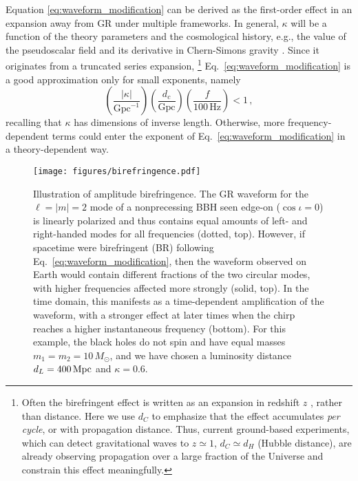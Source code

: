 \documentclass[aps,prd,twocolumn,superscriptaddress,preprintnumbers,nofootinbib]{revtex4-2}
\begin{document}
Equation \eqref{eq:waveform_modification} can be derived as the first-order effect in an expansion away from \ac{GR} under multiple frameworks.
In general, $\kappa$ will be a function of the theory parameters and the cosmological history, e.g., the value of the pseudoscalar field and its derivative in Chern-Simons gravity \cite{Alexander:2009tp}.
Since it originates from a truncated series expansion,%
\footnote{Often the birefringent effect is written as an expansion in redshift $z$ \cite[e.g.][]{Zhao:2019xmm}, rather than distance. Here we use $d_C$ to emphasize that the effect accumulates \emph{per cycle}, or with propagation distance.  Thus, current ground-based experiments, which can detect gravitational waves to $z \simeq 1$, $d_C \simeq d_H$ (Hubble distance), are already observing propagation over a large fraction of the Universe and constrain this effect meaningfully.} %
Eq.~\eqref{eq:waveform_modification} is a good approximation only for small exponents, namely
\begin{equation}
    \left(\frac{\left|\kappa\right|}{\mathrm{Gpc}^{-1}}\right) \left(\frac{d_c}{\mathrm{Gpc}}\right) \left(\frac{f}{100\, \mathrm{Hz}}\right) < 1\,,
    \label{eq:small_exponent}
\end{equation}
recalling that $\kappa$ has dimensions of inverse length.
Otherwise, more frequency-dependent terms could enter the exponent of Eq.~\eqref{eq:waveform_modification} in a theory-dependent way.
\begin{figure}
    \texttt{[image: figures/birefringence.pdf]}
    \caption{
        Illustration of amplitude birefringence. The GR waveform for the $\ell=|m|=2$ mode of a nonprecessing BBH seen edge-on ($\cos\iota = 0$) is linearly polarized and thus contains equal amounts of left- and right-handed modes for all frequencies (dotted, top).
        However, if spacetime were birefringent (BR) following Eq.~\protect\eqref{eq:waveform_modification}, then the waveform observed on Earth would contain different fractions of the two circular modes, with higher frequencies affected more strongly (solid, top). 
        In the time domain, this manifests as a time-dependent amplification of the waveform, with a stronger effect at later times when the chirp reaches a higher instantaneous frequency (bottom).
        For this example, the black holes do not spin and have equal masses $m_1 = m_2 = 10\, M_\odot$, and we have chosen a luminosity distance $d_L = 400\, {\rm Mpc}$ and $\kappa = 0.6$.
        }
    \label{fig:birefringence}
\end{figure}
\end{document}
